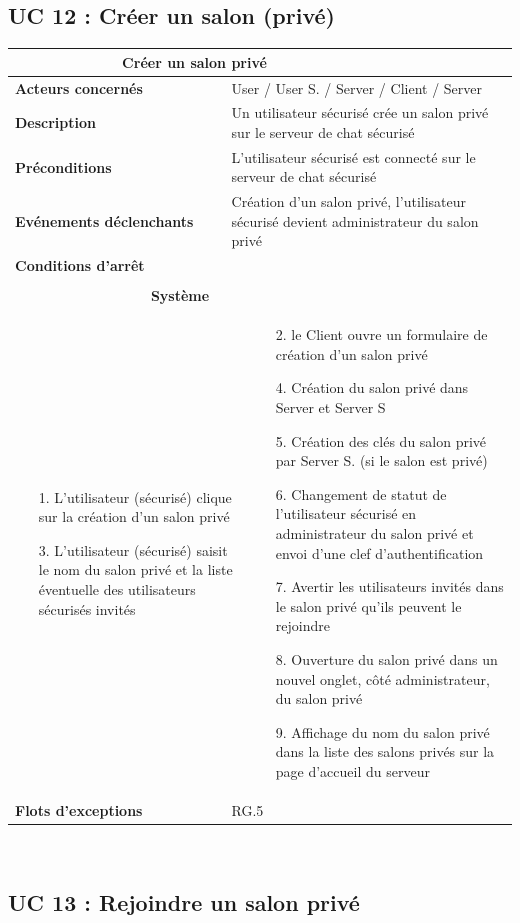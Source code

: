 \documentclass[a4paper,11pt,french]{article}
\newcommand{\fiche}[9] {
	\noindent
\begin{tabular}{|p{3.5cm}| p{1cm} | p{3cm} | p{.5cm} | p{7cm}|} 
\hline
\rowcolor{blue}
\multicolumn{2}{|l|}{\color{white}\bfseries{Nom}} & \multicolumn{3}{l|}{\color{white}\bfseries{#1}}\\
\hline
\multicolumn{2}{|l|}{\bfseries{Acteurs concernés}} & \multicolumn{3}{m{10.5cm}|}{#2}\\
\hline
\multicolumn{2}{|l|}{\bfseries{Description}} & \multicolumn{3}{m{10.5cm}|}{#3}\\
\hline
\multicolumn{2}{|l|}{\bfseries{Préconditions}} & \multicolumn{3}{m{10.5cm}|}{#4}\\
\hline
\multicolumn{2}{|l|}{\bfseries{Evénements déclenchants}} & \multicolumn{3}{m{10.5cm}|}{#5}\\
\hline
\multicolumn{2}{|l|}{\bfseries{Conditions d'arrêt}} & \multicolumn{3}{m{10.5cm}|}{#6}\\
\hline
\rowcolor{gray}
\multicolumn{5}{|c|}{\bfseries{Description du flot d'événements principal}}\\
\hline
\rowcolor{gray}
\multicolumn{3}{|c|}{\bfseries{Acteur(s)}} & \multicolumn{2}{c|}{\bfseries{Système}}\\
\hline
\multicolumn{3}{|p{7.5cm}|}{#7} & \multicolumn{2}{p{7.5cm}|}{#8}\\
\hline
\multicolumn{2}{|l}{\bfseries{Flots d'exceptions}} & \multicolumn{3}{|p{11.5cm}|}{#9}\\
\hline
\end{tabular}
\\
}
\begin{document}
\subsection{UC 12 : Créer un salon (privé)}

\fiche
	{Créer un salon privé} %
	{User / User S. / Server / Client / Server} %
	{Un utilisateur sécurisé crée un salon privé sur le serveur de chat sécurisé} %
	{L’utilisateur sécurisé est connecté sur le serveur de chat sécurisé} %
	{Création d’un salon privé, l’utilisateur sécurisé devient administrateur du salon privé} %
	{} %
	{\begin{itemize}  %
		\item [1.] L’utilisateur (sécurisé) clique sur la création d’un salon privé 
		\item[]  
		\item [3.] L’utilisateur (sécurisé) saisit le nom du salon privé et la liste éventuelle des utilisateurs sécurisés invités
	 \end{itemize}
	} 
	{\begin{itemize}  %
		\item []
		\item []
		\item [2.] le Client ouvre un formulaire de création d’un salon privé
		\item []
		\item []
		\item [4.] Création du salon privé dans Server et Server S
		\item [5.] Création des clés du salon privé par Server S. (si le salon est privé)
		\item [6.] Changement de statut de l’utilisateur sécurisé en administrateur du salon privé et envoi d'une clef d'authentification
		\item [7.] Avertir les utilisateurs invités dans le salon privé qu’ils peuvent le rejoindre
		\item [8.] Ouverture du salon privé dans un nouvel onglet, côté administrateur, du salon privé
		\item [9.] Affichage du nom du salon privé dans la liste des salons privés sur la page d’accueil du serveur
	 \end{itemize}
	 }
	{RG.5} %

\subsection{UC 13 : Rejoindre un salon privé}
\end{document}
